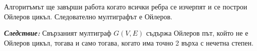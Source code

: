 \documentclass[11pt]{article} %
\newcommand{\italicBold}[1]{\textbf{\emph{#1}}}
\begin{document}
Алгоритъмът ще завърши работа когато всички ребра се изчерпят и се построи Ойлеров цикъл. Следователно мултиграфът е Ойлеров. \par

\italicBold{Следствие: }Свързаният мултиграф $G(V, E)$ съдържа Ойлеров път, който не е Ойлеров цикъл, тогава и само тогава, когато има точно 2 върха с нечетна степен.  
\end{document}
